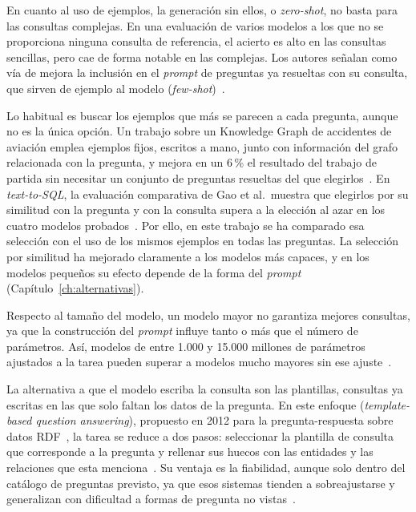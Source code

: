 \documentclass[11pt, a4paper]{report}
\begin{document}
	En cuanto al uso de ejemplos, la generación sin ellos, o \textit{zero-shot},
	no basta para las consultas complejas. En una evaluación de varios modelos
	a los que no se proporciona ninguna consulta de referencia, el acierto es
	alto en las consultas sencillas, pero cae de forma notable en las complejas. Los autores señalan como vía de
	mejora la inclusión en el \textit{prompt} de preguntas ya resueltas con su
	consulta, que sirven de ejemplo al modelo
	(\textit{few-shot})~\cite{giuliani2026-sparql-llm}.

	Lo habitual es buscar los ejemplos que más se parecen a cada pregunta, aunque
	no es la única opción. Un trabajo sobre un Knowledge Graph de
	accidentes de aviación emplea ejemplos fijos, escritos a mano, junto con
	información del grafo relacionada con la pregunta, y mejora en un 6\,\% el
	resultado del trabajo de partida sin necesitar un conjunto de preguntas
	resueltas del que elegirlos~\cite{hernandez2025-aviation-sparql}. En
	\textit{text-to-SQL}, la evaluación comparativa de Gao et al.\ muestra que
	elegirlos por su similitud con la pregunta y con la consulta supera a la
	elección al azar en los cuatro modelos probados~\cite{gao2024-dailsql}. Por ello,
	en este trabajo se ha comparado esa selección con el uso de los mismos
	ejemplos en todas las preguntas. La selección por similitud ha mejorado
	claramente a los modelos más capaces, y en los modelos pequeños su efecto
	depende de la forma del \textit{prompt} (Capítulo~\ref{ch:alternativas}).

	Respecto al tamaño del modelo, un modelo mayor no garantiza mejores
	consultas, ya que la construcción del \textit{prompt} influye tanto o más
	que el número de parámetros. Así, modelos de entre 1.000 y 15.000
	millones de parámetros ajustados a la tarea pueden superar a modelos mucho
	mayores sin ese ajuste~\cite{li2024-codes}.

	La alternativa a que el modelo escriba la consulta son las plantillas,
	consultas ya escritas en las que solo faltan los datos de la pregunta. En
	este enfoque (\textit{template-based question answering}), propuesto en 2012 para la pregunta-respuesta sobre datos RDF~\cite{unger2012-template-qa}, la tarea se reduce a dos pasos: seleccionar
	la plantilla de consulta que corresponde a la pregunta y rellenar sus huecos
	con las entidades y las relaciones que esta
	menciona~\cite{vollmers2021-tebaqa}. Su ventaja es la fiabilidad,
	aunque solo dentro del catálogo de preguntas previsto,
	ya que esos sistemas tienden a sobreajustarse y generalizan con dificultad a formas de pregunta no
	vistas~\cite{vollmers2021-tebaqa}.
\end{document}
